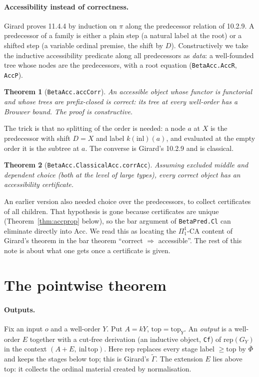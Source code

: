 \documentclass[11pt]{article}
\newtheorem{theorem}{Theorem}[section]
\theoremstyle{remark}
\newcommand{\Phib}{\overline{\Phi}}
\newcommand{\Acc}{\mathrm{Acc}}
\newcommand{\rep}{\mathrm{rep}}
\renewcommand{\tt}[1]{\texttt{#1}}
\begin{document}
\paragraph{Accessibility instead of correctness.} Girard proves 11.4.4 by
induction on $\pi$ along the predecessor relation of 10.2.9. A predecessor
of a family is either a plain step (a natural label at the root) or a
shifted step (a variable ordinal premise, the shift by $D$). Constructively
we take the inductive accessibility predicate along all predecessors as
\emph{data}: a well-founded tree whose nodes are the predecessors, with a
root equation (\tt{BetaAcc.AccR}, \tt{AccP}).

\begin{theorem}[\tt{BetaAcc.accCorr}]
An accessible object whose functor is functorial and whose trees are
prefix-closed is correct: its tree at every well-order has a Brouwer
bound. The proof is constructive.
\end{theorem}

The trick is that no splitting of the order is needed: a node $a$ at $X$
is the predecessor with shift $D=X$ and label $k(\mathrm{inl})(a)$, and
evaluated at the empty order it is the subtree at $a$. The converse is
Girard's 10.2.9 and is classical.

\begin{theorem}[\tt{BetaAcc.ClassicalAcc.corrAcc}]
Assuming excluded middle and dependent choice (both at the level of
large types), every correct object has an accessibility certificate.
\end{theorem}

An earlier version also needed choice over the predecessors, to collect
certificates of all children. That hypothesis is gone because certificates
are unique (Theorem~\ref{thm:accprop} below), so the bar argument of
\tt{BetaPred.Cl} can eliminate directly into $\Acc$. We read this as
locating the $\Pi^1_1$-$\mathrm{CA}$ content of Girard's theorem in the
bar theorem ``correct $\Rightarrow$ accessible''. The rest of this note is
about what one gets once a certificate is given.

\section{The pointwise theorem}

\paragraph{Outputs.} Fix an input $o$ and a well-order $Y$. Put
$A=kY$, $\mathrm{top}=\mathrm{top}_Y$. An \emph{output} is a well-order $E$ together with
a cut-free derivation (an inductive object, \tt{Cf}) of $\rep(G_Y)$ in the
context $(A+E,\ \mathrm{inl}\,\mathrm{top})$. Here $\rep$ replaces every stage
label $\ge\mathrm{top}$ by $\Phib$ and keeps the stages below top; this is
Girard's $\widetilde\Gamma$. The extension $E$ lies above top: it collects
the ordinal material created by normalisation.
\end{document}
